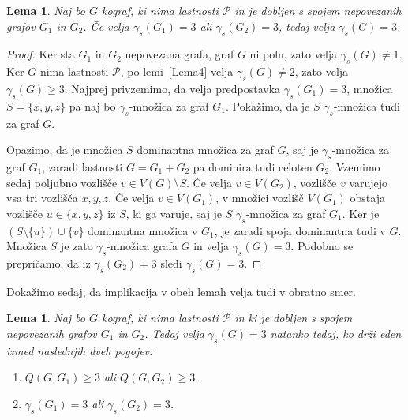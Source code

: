 \documentclass[12pt,a4paper,twoside]{article}
\theoremstyle{definition} %
\theoremstyle{plain} %
\newtheorem{lema}[definicija]{Lema}
\numberwithin{equation}{section}  %
\begin{document}
 \begin{lema}\label{Lema10}
 Naj bo $G$ kograf, ki nima lastnosti $\mathcal{P}$ in je dobljen s spojem nepovezanih grafov $G_1$ in $G_2$. Če velja $\gamma_s(G_1) = 3$ ali $\gamma_s(G_2) = 3$, tedaj velja $\gamma_s(G) = 3$.
 \end{lema}
 \begin{proof}
 Ker sta $G_1$ in $G_2$ nepovezana grafa, graf $G$ ni poln, zato velja $\gamma_s(G) \neq 1$. Ker $G$ nima lastnosti $\mathcal{P}$, po lemi~\ref{Lema4} velja $\gamma_s(G) \neq 2$, zato velja $\gamma_s(G) \geq 3$. Najprej privzemimo, da velja predpostavka $\gamma_s(G_1) = 3$, množica $S = \{x, y, z\}$ pa naj bo $\gamma_s$-množica za graf $G_1$. Pokažimo, da je $S$ $\gamma_s$-množica tudi za graf $G$.
 
Opazimo, da je množica $S$ dominantna množica za graf $G$, saj je $\gamma_s$-množica za graf $G_1$, zaradi lastnosti $G = G_1 + G_2$ pa dominira tudi celoten $G_2$. Vzemimo sedaj poljubno vozlišče $v \in V(G) \setminus S$. Če velja $v \in V(G_2)$, vozlišče $v$ varujejo vsa tri vozlišča $x, y, z$. Če velja $v \in V(G_1)$, v množici vozlišč $V(G_1)$ obstaja vozlišče $u \in \{x, y, z\}$ iz $S$, ki ga varuje, saj je $S$ $\gamma_s$-množica za graf $G_1$. Ker je $(S \setminus \{u\}) \cup \{v\}$ dominantna množica v $G_1$, je zaradi spoja dominantna tudi v $G$. Množica $S$ je zato $\gamma_s$-množica grafa $G$ in velja $\gamma_s(G) = 3$. Podobno se prepričamo, da iz $\gamma_s(G_2) = 3$ sledi $\gamma_s(G) = 3$. 
 \end{proof}
 
 Dokažimo sedaj, da implikacija v obeh lemah velja tudi v obratno smer.
 
 \begin{lema}\label{Lema11}
 Naj bo $G$ kograf, ki nima lastnosti $\mathcal{P}$ in ki je dobljen s spojem nepovezanih grafov $G_1$ in $G_2$. Tedaj velja $\gamma_s(G) = 3$ natanko tedaj, ko drži eden izmed naslednjih dveh pogojev:
\begin{enumerate}[label=($\roman*$)]
\item $Q(G, G_1) \geq 3$ ali $Q(G, G_2) \geq 3$.
\item $\gamma_s(G_1) = 3$ ali $\gamma_s(G_2) = 3$.
\end{enumerate}
 \end{lema}
 
\end{document}
